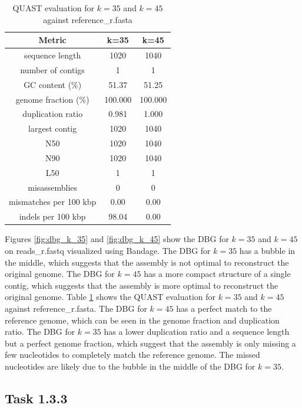 \documentclass[12pt]{article}
\begin{document}
\begin{table}[h!]
\begin{center}
\begin{tabular}{ |c|c|c| }
    \hline
    Metric & k=35 & k=45 \\
    \hline
    sequence length & 1020 & 1040 \\
    number of contigs & 1 & 1 \\
    GC content (\%) & 51.37 & 51.25 \\
    genome fraction (\%) & 100.000 & 100.000 \\
    duplication ratio & 0.981 & 1.000 \\
    largest contig & 1020 & 1040 \\
    N50 & 1020 & 1040 \\
    N90 & 1020 & 1040 \\
    L50 & 1 & 1 \\
    misassemblies & 0 & 0 \\
    mismatches per 100 kbp & 0.00 & 0.00 \\
    indels per 100 kbp & 98.04 & 0.00 \\
    \hline
\end{tabular}
\caption{QUAST evaluation for $k=35$ and $k=45$ against reference\_r.fasta}
\label{tab:quast_k35_k45}
\end{center}
\end{table}

Figures \ref{fig:dbg_k_35} and \ref{fig:dbg_k_45} show the DBG for $k=35$ and $k=45$ on reads\_r.fastq visualized using Bandage. The DBG for $k=35$ has a bubble in the middle, which suggests that the assembly is not optimal to reconstruct the original genome. The DBG for $k=45$ has a more compact structure of a single contig, which suggests that the assembly is more optimal to reconstruct the original genome.
Table \ref{tab:quast_k35_k45} shows the QUAST evaluation for $k=35$ and $k=45$ against reference\_r.fasta. The DBG for $k=45$ has a perfect match to the reference genome, which can be seen in the genome fraction and duplication ratio. The DBG for $k=35$ has a lower duplication ratio and a sequence length but a perfect genome fraction, which suggest that the assembly is only missing a few nucleotides to completely match the reference genome.
The missed nucleotides are likely due to the bubble in the middle of the DBG for $k=35$.


\subsection{Task 1.3.3}
\end{document}
